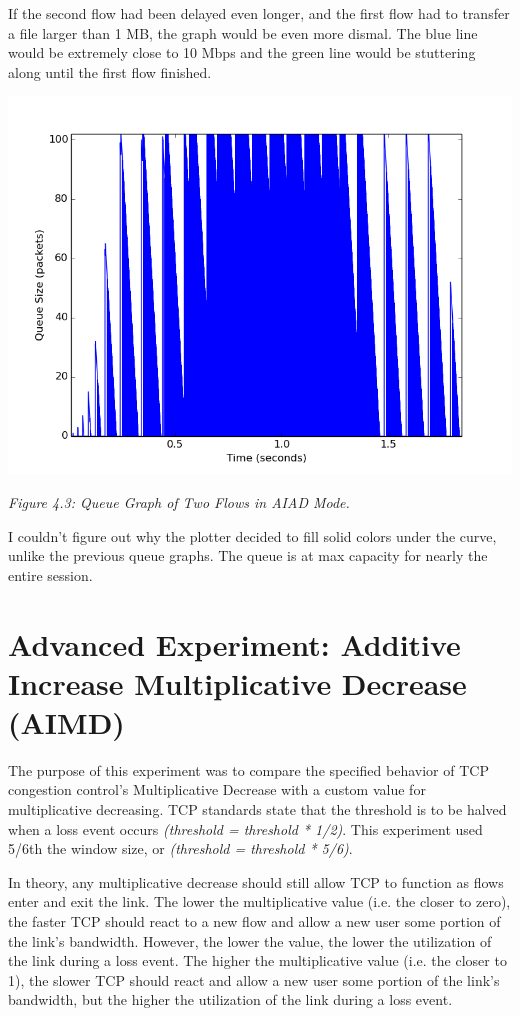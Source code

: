 \documentclass[11pt]{article}
\begin{document}
If the second flow had been delayed even longer, and the first flow had to transfer a file larger than 1 MB, the graph would be even more dismal. The blue line would be extremely close to 10 Mbps and the green line would be stuttering along until the first flow finished.


\includegraphics[width=17cm]{outputs/AIAD/AIAD_queue.png}

\centerline{\emph{Figure 4.3: Queue Graph of Two Flows in AIAD Mode.}}

I couldn't figure out why the plotter decided to fill solid colors under the curve, unlike the previous queue graphs. The queue is at max capacity for nearly the entire session.




\section{Advanced Experiment: Additive Increase Multiplicative Decrease (AIMD)}

The purpose of this experiment was to compare the specified behavior of TCP congestion control's Multiplicative Decrease with a custom value for multiplicative decreasing. TCP standards state that the threshold is to be halved when a loss event occurs \emph{(threshold = threshold * 1/2)}. This experiment used 5/6th the window size, or \emph{(threshold = threshold * 5/6)}.

In theory, any multiplicative decrease should still allow TCP to function as flows enter and exit the link. The lower the multiplicative value (i.e. the closer to zero), the faster TCP should react to a new flow and allow a new user some portion of the link's bandwidth. However, the lower the value, the lower the utilization of the link during a loss event. The higher the multiplicative value (i.e. the closer to 1), the slower TCP should react and allow a new user some portion of the link's bandwidth, but the higher the utilization of the link during a loss event.
\end{document}
